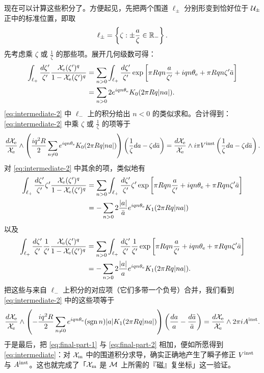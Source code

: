 现在可以计算这些积分了。方便起见，先把两个围道 $\ell_\pm$ 分别形变到恰好位于 $\mathcal{U}_\pm$ 正中的标准位置，即取
\begin{equation}
\ell_\pm = \left\{ \zeta: \pm \frac{a}{\zeta} \in \mathbb{R}_- \right\}.
\end{equation}
先考虑乘 $\zeta$ 或 $\frac{1}{\zeta}$ 的那些项。展开几何级数可得：
\begin{align}
\int_{\ell_+}  \frac{d \zeta'}{\zeta'} \frac{\mathcal{X}_{\mathrm{e}}(\zeta')^{q}}{1-\mathcal{X}_{\mathrm{e}}(\zeta')^{q}} &=
\sum_{n>0} \int_{\ell_+} \frac{d \zeta'}{\zeta'}
\exp \left[ \pi R q n\frac{a}{\zeta'} + i q n\theta_{\mathrm{e}} + \pi R q n \zeta' \bar{a} \right] \\
&= \sum_{n>0} 2 e^{i q n\theta_{\mathrm{e}}}K_0(2 \pi R q|na|).
\end{align}
\eqref{eq:intermediate-2} 中 $\ell_-$ 上的积分给出 $n<0$ 的类似求和。合计得到：\eqref{eq:intermediate-2} 中乘 $\zeta$ 或 $\frac{1}{\zeta}$ 的项等于
\begin{equation} \label{eq:final-part-1}
\frac{d\mathcal{X}_{\mathrm{e}}}{\mathcal{X}_{\mathrm{e}}} \wedge \left( \frac{i q^2 R}{2} \sum_{n \neq 0} e^{i q n\theta_{\mathrm{e}}}K_0(2 \pi R q|na|) \right) \left(\frac{1}{\zeta} da - \zeta d\bar{a}\right) = \frac{d\mathcal{X}_{\mathrm{e}}}{\mathcal{X}_{\mathrm{e}}} \wedge i \pi V^{\mathrm{inst}}\left(\frac{1}{\zeta} da - \zeta d\bar{a}\right).
\end{equation}
对 \eqref{eq:intermediate-2} 中其余的项，类似地有
\begin{align}
\int_{\ell_+}  \frac{d \zeta'}{\zeta'} \zeta' \frac{\mathcal{X}_{\mathrm{e}}(\zeta')^{q}}{1-\mathcal{X}_{\mathrm{e}}(\zeta')^{q}} &=
\sum_{n>0} \int_{\ell_+} \frac{d \zeta'}{\zeta'}
\zeta' \exp \left[ \pi R q n\frac{a}{\zeta'} + i q n\theta_{\mathrm{e}} + \pi R q n \zeta' \bar{a} \right] \\
&= - \sum_{n>0} 2 \frac{\lvert a \rvert}{\bar{a}} e^{i q n\theta_{\mathrm{e}}}K_1(2 \pi R q|na|)
\end{align}
以及
\begin{align}
\int_{\ell_+}  \frac{d \zeta'}{\zeta'} \frac{1}{\zeta'} \frac{\mathcal{X}_{\mathrm{e}}(\zeta')^{q}}{1-\mathcal{X}_{\mathrm{e}}(\zeta')^{q}} &=
\sum_{n>0} \int_{\ell_+} \frac{d \zeta'}{\zeta'}
\frac{1}{\zeta'} \exp \left[ \pi R q n\frac{a}{\zeta'} + i q n\theta_{\mathrm{e}} + \pi R q n \zeta' \bar{a} \right] \\
&= - \sum_{n>0} 2 \frac{\lvert a \rvert}{a} e^{i q n\theta_{\mathrm{e}}}K_{1}(2 \pi R q|na|).
\end{align}
把这些与来自 $\ell_-$ 上积分的对应项（它们多带一个负号）合并，我们看到 \eqref{eq:intermediate-2} 中的这些项等于
\begin{equation} \label{eq:final-part-2}
\frac{d\mathcal{X}_{\mathrm{e}}}{\mathcal{X}_{\mathrm{e}}} \wedge \left( - \frac{i q^2 R}{2} \sum_{n \neq 0} e^{i q n\theta_{\mathrm{e}}} (\operatorname{sgn} n) \lvert a \rvert K_1(2 \pi R q|na|) \right) \left( \frac{da}{a} - \frac{d \bar a}{\bar a} \right) = \frac{d\mathcal{X}_{\mathrm{e}}}{\mathcal{X}_{\mathrm{e}}} \wedge 2 \pi i A^{\mathrm{inst}}.
\end{equation}
于是最后，把 \eqref{eq:final-part-1} 与 \eqref{eq:final-part-2} 相加，便如所愿得到 \eqref{eq:intermediate}：对 $\mathcal{X}_{\mathrm{m}}$ 中的围道积分求导，确实正确地产生了瞬子修正 $V^{\mathrm{inst}}$ 与 $A^{\mathrm{inst}}$。这也就完成了「$\mathcal{X}_{\mathrm{m}}$ 是 $\mathcal{M}$ 上所需的『磁』复坐标」这一验证。

